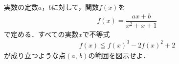 \documentclass[../../main.tex]{subfiles}
\begin{document}
実数の定数$a$，$b$に対して，関数$f(x)$を
\begin{align*}
  f(x)=\dfrac{ax+b}{x^2+x+1}
\end{align*}
で定める．すべての実数$x$で不等式
\begin{align*}
  f(x)\leqq{f(x)}^3-2{f(x)}^2+2
\end{align*}
が成り立つような点$(a, \, b)$の範囲を図示せよ．
\end{document}
